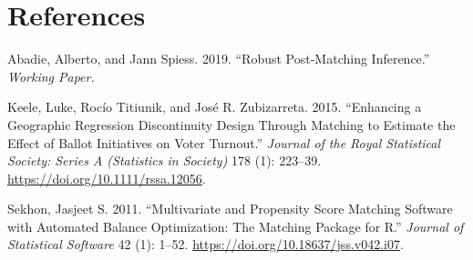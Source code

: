 \documentclass[
  12pt,
]{article}
\newlength{\cslhangindent}
\newenvironment{cslreferences}%
  {\setlength{\parindent}{0pt}%
  \everypar{\setlength{\hangindent}{\cslhangindent}}\ignorespaces}%
  {\par}
\begin{document}
\hypertarget{references}{%
\section*{References}\label{references}}

\hypertarget{refs}{}
\begin{cslreferences}
\leavevmode\hypertarget{ref-Abadie2019}{}%
Abadie, Alberto, and Jann Spiess. 2019. ``Robust Post-Matching Inference.'' \emph{Working Paper.}

\leavevmode\hypertarget{ref-Keele2015}{}%
Keele, Luke, Rocío Titiunik, and José R. Zubizarreta. 2015. ``Enhancing a Geographic Regression Discontinuity Design Through Matching to Estimate the Effect of Ballot Initiatives on Voter Turnout.'' \emph{Journal of the Royal Statistical Society: Series A (Statistics in Society)} 178 (1): 223--39. \url{https://doi.org/10.1111/rssa.12056}.

\leavevmode\hypertarget{ref-Sekhon2011}{}%
Sekhon, Jasjeet S. 2011. ``Multivariate and Propensity Score Matching Software with Automated Balance Optimization: The Matching Package for R.'' \emph{Journal of Statistical Software} 42 (1): 1--52. \url{https://doi.org/10.18637/jss.v042.i07}.
\end{cslreferences}
\end{document}
